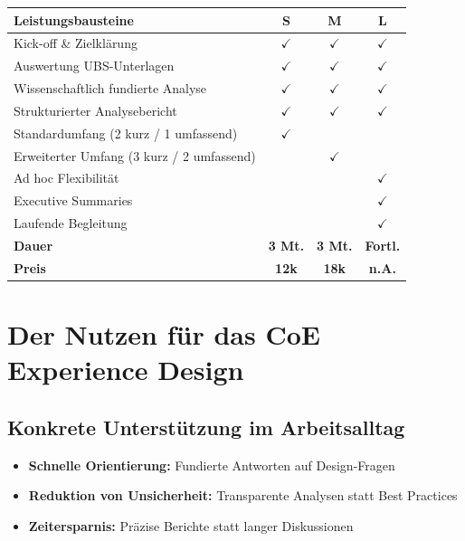 \documentclass[11pt,a4paper]{article}
\newcommand{\fahead}[1]{\textcolor{fawhite}{\bfseries #1}}
\begin{document}
\begin{center}
\begin{tabular}{p{7cm}ccc}
\toprule
\rowcolor{fadarkblue}
\fahead{Leistungsbausteine} & \fahead{S} & \fahead{M} & \fahead{L} \\
\midrule
\rowcolor{fawhite}
Kick-off \& Zielklärung & $\checkmark$ & $\checkmark$ & $\checkmark$ \\
\rowcolor{falightgray}
Auswertung UBS-Unterlagen & $\checkmark$ & $\checkmark$ & $\checkmark$ \\
\rowcolor{fawhite}
Wissenschaftlich fundierte Analyse & $\checkmark$ & $\checkmark$ & $\checkmark$ \\
\rowcolor{falightgray}
Strukturierter Analysebericht & $\checkmark$ & $\checkmark$ & $\checkmark$ \\
\rowcolor{fawhite}
Standardumfang (2 kurz / 1 umfassend) & $\checkmark$ & & \\
\rowcolor{falightgray}
Erweiterter Umfang (3 kurz / 2 umfassend) & & $\checkmark$ & \\
\rowcolor{fawhite}
Ad hoc Flexibilität & & & $\checkmark$ \\
\rowcolor{falightgray}
Executive Summaries & & & $\checkmark$ \\
\rowcolor{fawhite}
Laufende Begleitung & & & $\checkmark$ \\
\midrule
\rowcolor{falightgray}
\textbf{Dauer} & \textbf{3 Mt.} & \textbf{3 Mt.} & \textbf{Fortl.} \\
\rowcolor{fadarkblue}
\fahead{Preis} & \fahead{12k} & \fahead{18k} & \fahead{n.A.} \\
\bottomrule
\end{tabular}
\end{center}

\newpage
\section{Der Nutzen für das CoE Experience Design}

\subsection{Konkrete Unterstützung im Arbeitsalltag}

\begin{itemize}
    \item[$\checkmark$] \textbf{Schnelle Orientierung:} Fundierte Antworten auf Design-Fragen
    \item[$\checkmark$] \textbf{Reduktion von Unsicherheit:} Transparente Analysen statt Best Practices
    \item[$\checkmark$] \textbf{Zeitersparnis:} Präzise Berichte statt langer Diskussionen
\end{itemize}
\end{document}
